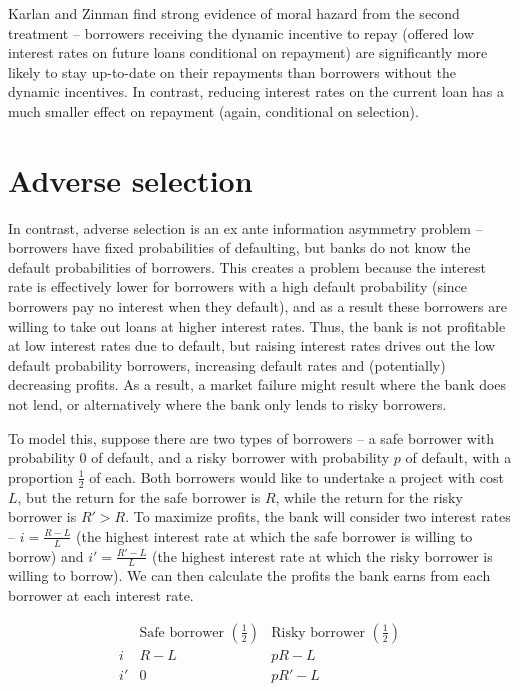 \documentclass[12pt,english]{article}
\begin{document}
Karlan and Zinman find strong evidence of moral hazard from the second treatment -- borrowers receiving the dynamic incentive to repay (offered low interest rates on future loans conditional on repayment) are significantly more likely to stay up-to-date on their repayments than borrowers without the dynamic incentives. In contrast, reducing interest rates on the current loan has a much smaller effect on repayment (again, conditional on selection).

\section{Adverse selection}

In contrast, adverse selection is an ex ante information asymmetry problem -- borrowers have fixed probabilities of defaulting, but banks do not know the default probabilities of borrowers. This creates a problem because the interest rate is effectively lower for borrowers with a high default probability (since borrowers pay no interest when they default), and as a result these borrowers are willing to take out loans at higher interest rates. Thus, the bank is not profitable at low interest rates due to default, but raising interest rates drives out the low default probability borrowers, increasing default rates and (potentially) decreasing profits. As a result, a market failure might result where the bank does not lend, or alternatively where the bank only lends to risky borrowers.

To model this, suppose there are two types of borrowers -- a safe borrower with probability 0 of default, and a risky borrower with probability $p$ of default, with a proportion $\frac{1}{2}$ of each. Both borrowers would like to undertake a project with cost $L$, but the return for the safe borrower is $R$, while the return for the risky borrower is $R' > R$. To maximize profits, the bank will consider two interest rates -- $i = \frac{R - L}{L}$ (the highest interest rate at which the safe borrower is willing to borrow) and $i' = \frac{R' - L}{L}$ (the highest interest rate at which the risky borrower is willing to borrow). We can then calculate the profits the bank earns from each borrower at each interest rate.

$$
\begin{array}{c|c|c}
& \text{Safe borrower } \left(\frac{1}{2}\right) & \text{Risky borrower } \left(\frac{1}{2}\right) \\
\hline
i & R - L & pR - L \\
\hline
i' & 0 & pR' - L
\end{array}
$$
\end{document}
